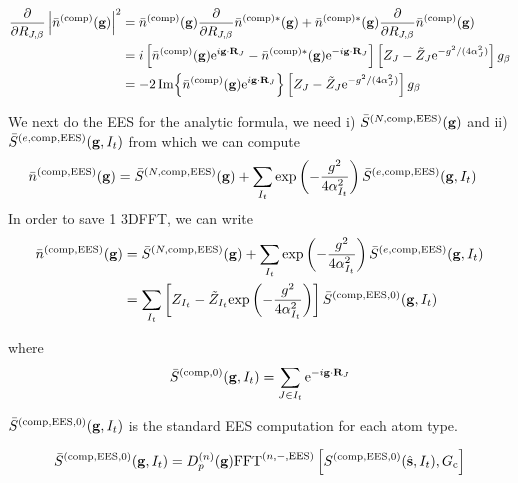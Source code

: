 \documentclass[paper=a4, fontsize=11pt]{article} %
\numberwithin{equation}{section} %
\numberwithin{figure}{section} %
\numberwithin{table}{section} %
\newcommand{\p}{\partial}
\newcommand{\bg}{{\bf{g}}}
\newcommand{\bR}{{\bf{R}}}
\newcommand{\hs}{{\hat{\bf{s}}}}
\newcommand{\rexp}{{\mathrm{exp}}}
\newcommand{\rEES}{{\mathrm{EES}}}
\newcommand{\re}{{\mathrm{e}}}
\newcommand{\rcomp}{{\mathrm{comp}}}
\newcommand{\ibgR}{i\bg\cdot\bR}
\newcommand{\al}{{\alpha}}
\newcommand{\RJb}{{R_{J,\beta}}}
\newcommand{\Gc}{{G_{\mathrm{c}}}}
\newcommand{\Dng}{{D^{(n)}_p(\bg)}}
\newcommand{\FFTniEES}{{\mathrm{FFT}^{(n,-,\rEES)}}}
\begin{document}
\begin{equation}
\begin{split}
\frac{\p}{\p \RJb}\left|\bar n ^{(\rcomp)}(\bg)\right|^2
&= \bar n ^{(\rcomp)}(\bg) \frac{\p}{\p \RJb}  \bar n ^{(\rcomp)*}(\bg) + \bar n ^{(\rcomp)*}(\bg) \frac{\p}{\p \RJb}  \bar n ^{(\rcomp)}(\bg) \\
&= i\left[\bar n ^{(\rcomp)}(\bg) \re^{\ibgR_{J}} - \bar n ^{(\rcomp)*}(\bg)\re^{-\ibgR_{J}}\right]\left[Z_J - \tilde Z_J\re^{- g^2/(4\al_{J}^2)}\right] g_{\beta}\\
&= -2 \Im{\bar n ^{(\rcomp)}(\bg) \re^{\ibgR_{J}}}\left[Z_J - \tilde Z_J\re^{- g^2/(4\al_{J}^2)}\right] g_{\beta}
\end{split}
\end{equation}




We next do the EES for the analytic formula, we need i) $\bar S^{(N,\rcomp,\rEES)}(\bg)
$ and ii) $\bar S^{(e,\rcomp,\rEES)}(\bg,I_t)$ from which we can compute
\begin{equation}
\begin{split}
\bar n ^{(\rcomp,\rEES)}(\bg)
&= \bar S^{(N,\rcomp,\rEES)}(\bg) + \sum_{I_t}\rexp\left(-\frac{g^2}{4\al_{I_t}^2}\right)\bar S^{(e,\rcomp,\rEES)}(\bg,I_t)
\end{split}
\end{equation}
In order to save 1 3DFFT, we can write 
\begin{equation}
\begin{split}
\bar n ^{(\rcomp,\rEES)}(\bg)
&= \bar S^{(N,\rcomp,\rEES)}(\bg) + \sum_{I_t}\rexp\left(-\frac{g^2}{4\al_{I_t}^2}\right)\bar S^{(e,\rcomp,\rEES)}(\bg,I_t)\\
&= \sum_{I_t} \left[Z_{I_t} - \tilde{Z}_{I_t} \rexp\left(-\frac{g^2}{4\al_{I_t}^2}\right)\right] \bar S^{(\rcomp,\rEES,0)}(\bg,I_t)
\end{split}
\end{equation}

where 
\begin{equation}
\bar S^{(\rcomp,0)}(\bg,I_t) = \sum_{J \in I_t} \re^{-\ibgR_J }
\end{equation}

$\bar S^{(\rcomp,\rEES,0)}(\bg,I_t)$ is the standard EES computation for each atom type.

\begin{equation}
\begin{split}
\bar S^{(\rcomp,\rEES,0)}(\bg,I_t)
 &= \Dng \FFTniEES \left[ S^{(\rcomp,\rEES,0)}(\hs,I_t), \Gc \right]\\
\end{split}
\end{equation}
\end{document}
